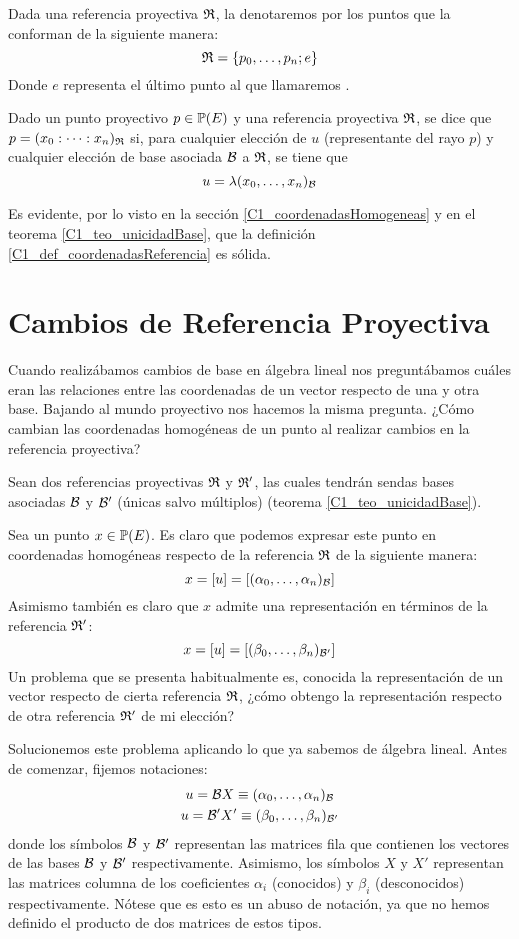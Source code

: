 Dada una referencia proyectiva $\mathfrak{R}$, la denotaremos por los puntos que la conforman de la siguiente manera:
\begin{equation}
\label{C1_eq_notacionReferencias}
\mathfrak{R}=\{p_0,\dots,p_n;e\}
\end{equation}
Donde $e$ representa el último punto al que llamaremos .
\begin{defi}
	\label{C1_def_coordenadasReferencia}
	Dado un punto proyectivo $p\in\mathbb{P}(E)$ y una referencia proyectiva $\mathfrak{R}$, se dice que $p=(x_0:\dots :x_n)_{\mathfrak{R}}$ si, para cualquier elección de $u$ (representante del rayo $p$) y cualquier elección de base asociada $\mathcal{B}$ a $\mathfrak{R}$, se tiene que
	\[u=\lambda(x_0,\dots,x_n)_{\mathcal{B}}\]
\end{defi}
Es evidente, por lo visto en la sección \ref{C1_coordenadasHomogeneas} y en el teorema \ref{C1_teo_unicidadBase}, que la definición \ref{C1_def_coordenadasReferencia} es sólida.
\section{Cambios de Referencia Proyectiva}
Cuando realizábamos cambios de base en álgebra lineal nos preguntábamos cuáles eran las relaciones entre las coordenadas de un vector respecto de una y otra base. Bajando al mundo proyectivo nos hacemos la misma pregunta. ¿Cómo cambian las coordenadas homogéneas de un punto al realizar cambios en la referencia proyectiva?

Sean dos referencias proyectivas $\mathfrak{R}$ y $\mathfrak{R}'$, las cuales tendrán sendas bases asociadas $\mathcal{B}$ y $\mathcal{B}'$ (únicas salvo múltiplos) (teorema \ref{C1_teo_unicidadBase}).

Sea un punto $x\in\mathbb{P}(E)$. Es claro que podemos expresar este punto en coordenadas homogéneas respecto de la referencia $\mathfrak{R}$ de la siguiente manera:
\[x=\left [ u \right ]=\left [ (\alpha_0,\dots,\alpha_n)_{\mathcal{B}} \right ]\]
Asimismo también es claro que $x$ admite una representación en términos de la referencia $\mathfrak{R}'$:
\[x=\left [ u \right ]=\left [ (\beta_0,\dots,\beta_n)_{\mathcal{B}'} \right ]\]
Un problema que se presenta habitualmente es, conocida la representación de un vector respecto de cierta referencia $\mathfrak{R}$, ¿cómo obtengo la representación respecto de otra referencia $\mathfrak{R}'$ de mi elección?

Solucionemos este problema aplicando lo que ya sabemos de álgebra lineal. Antes de comenzar, fijemos notaciones:
\begin{gather*}
	u=\mathcal{B}X\equiv(\alpha_0,\dots,\alpha_n)_{\mathcal{B}}\\
	u=\mathcal{B}'X'\equiv(\beta_0,\dots,\beta_n)_{\mathcal{B}'}
\end{gather*}
donde los símbolos $\mathcal{B}$ y $\mathcal{B}'$ representan las matrices fila que contienen los vectores de las bases $\mathcal{B}$ y $\mathcal{B}'$ respectivamente. Asimismo, los símbolos $X$ y $X'$ representan las matrices columna de los coeficientes $\alpha_i$ (conocidos) y $\beta_i$ (desconocidos) respectivamente. Nótese que es esto es un abuso de notación, ya que no hemos definido el producto de dos matrices de estos tipos.

